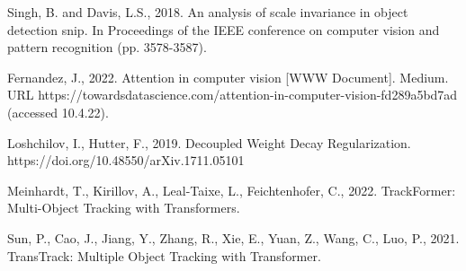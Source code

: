 \begin{thebibliography}{ widest-label }
	Singh, B. and Davis, L.S., 2018. An analysis of scale invariance in object detection snip. In Proceedings of the IEEE conference on computer vision and pattern recognition (pp. 3578-3587).
	
	Fernandez, J., 2022. Attention in computer vision [WWW Document]. Medium. URL https://towardsdatascience.com/attention-in-computer-vision-fd289a5bd7ad (accessed 10.4.22).
	
	Loshchilov, I., Hutter, F., 2019. Decoupled Weight Decay Regularization. https://doi.org/10.48550/arXiv.1711.05101
	
	Meinhardt, T., Kirillov, A., Leal-Taixe, L., Feichtenhofer, C., 2022. TrackFormer: Multi-Object Tracking with Transformers.
	
	Sun, P., Cao, J., Jiang, Y., Zhang, R., Xie, E., Yuan, Z., Wang, C., Luo, P., 2021. TransTrack: Multiple Object Tracking with Transformer.
\end{thebibliography}
